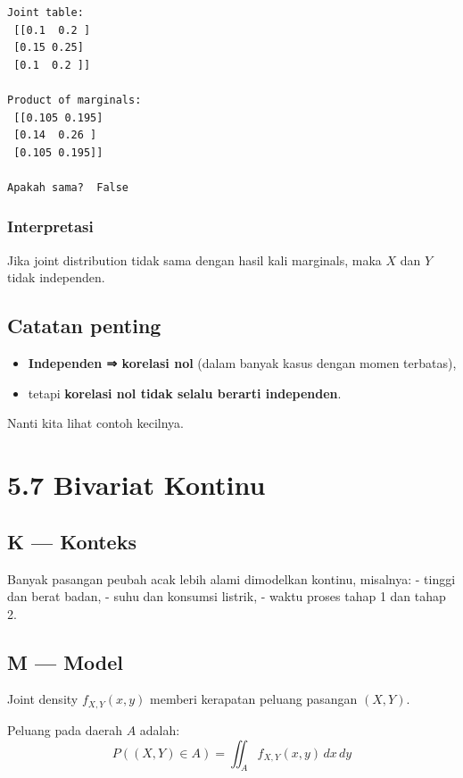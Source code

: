 \documentclass[
  letterpaper,
  DIV=11,
  numbers=noendperiod]{scrreprt}
\providecommand{\tightlist}{%
  \setlength{\itemsep}{0pt}\setlength{\parskip}{0pt}}
\begin{document}
\begin{verbatim}
Joint table:
 [[0.1  0.2 ]
 [0.15 0.25]
 [0.1  0.2 ]]

Product of marginals:
 [[0.105 0.195]
 [0.14  0.26 ]
 [0.105 0.195]]

Apakah sama?  False
\end{verbatim}

\subsubsection{Interpretasi}\label{interpretasi-18}

Jika joint distribution tidak sama dengan hasil kali marginals, maka
\(X\) dan \(Y\) tidak independen.

\subsection{Catatan penting}\label{catatan-penting-1}

\begin{itemize}
\tightlist
\item
  \textbf{Independen ⇒ korelasi nol} (dalam banyak kasus dengan momen
  terbatas),
\item
  tetapi \textbf{korelasi nol tidak selalu berarti independen}.
\end{itemize}

Nanti kita lihat contoh kecilnya.

\section{5.7 Bivariat Kontinu}\label{bivariat-kontinu}

\subsection{K --- Konteks}\label{k-konteks-35}

Banyak pasangan peubah acak lebih alami dimodelkan kontinu, misalnya: -
tinggi dan berat badan, - suhu dan konsumsi listrik, - waktu proses
tahap 1 dan tahap 2.

\subsection{M --- Model}\label{m-model-35}

Joint density \(f_{X,Y}(x,y)\) memberi kerapatan peluang pasangan
\((X,Y)\).

Peluang pada daerah \(A\) adalah: \[
P((X,Y)\in A)=\iint_A f_{X,Y}(x,y)\,dx\,dy
\]
\end{document}

